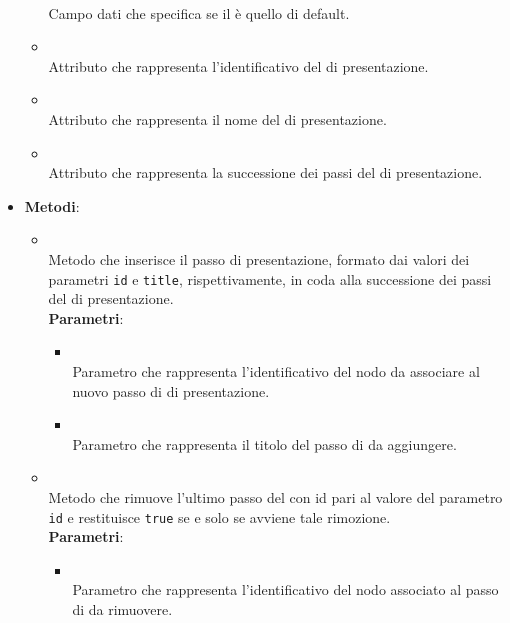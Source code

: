\begin{itemize}
\begin{itemize}
\\ Campo dati che specifica se il  è quello di default.
\item {}
\\ Attributo che rappresenta l'identificativo del  di presentazione.
\item {}
\\ Attributo che rappresenta il nome del  di presentazione.
\item {}
\\ Attributo che rappresenta la successione dei passi del  di presentazione.
\end{itemize}
\item \textbf{Metodi}:
\begin{itemize}
\item {}
\\ Metodo che inserisce il passo di presentazione, formato dai valori dei parametri \texttt{id} e \texttt{title}, rispettivamente, in coda alla successione dei passi del  di presentazione.
\\ \textbf{Parametri}:
\begin{itemize}
\item {}
\\ Parametro che rappresenta l'identificativo del nodo da associare al nuovo passo di  di presentazione.
\item {}
\\ Parametro che rappresenta il titolo del passo di  da aggiungere.
\end{itemize}
\item {}
\\ Metodo che rimuove l'ultimo passo del  con id pari al valore del parametro \texttt{id} e restituisce \texttt{true} se e solo se avviene tale rimozione.
\\ \textbf{Parametri}:
\begin{itemize}
\item {}
\\ Parametro che rappresenta l'identificativo del nodo associato al passo di  da rimuovere.
\end{itemize}

\end{itemize}
\end{itemize}
